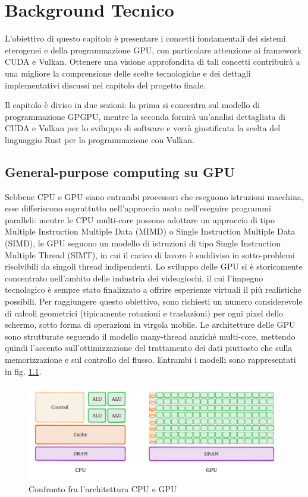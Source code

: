 \chapter{Background Tecnico}
\label{sec:background}


L'obiettivo di questo capitolo è presentare i concetti fondamentali dei sistemi eterogenei e della programmazione GPU, con particolare attenzione ai framework CUDA e Vulkan. Ottenere una visione approfondita di tali concetti contribuirà a una migliore la comprensione delle scelte tecnologiche e dei dettagli implementativi discussi nel capitolo del progetto finale. 

Il capitolo è diviso in due sezioni: la prima si concentra sul modello di programmazione GPGPU, mentre la seconda fornirà un'analisi dettagliata di CUDA e Vulkan per lo sviluppo di software e verrà giustificata la scelta del linguaggio Rust per la programmazione con Vulkan.

\section[General-purpose computing su GPU]{General-purpose computing su GPU}

Sebbene CPU e GPU siano entrambi processori che eseguono istruzioni macchina, esse differiscono soprattutto nell'approccio usato nell'eseguire programmi paralleli: mentre le CPU multi-core possono adottare un approccio di tipo Multiple Instruction Multiple Data (\gls{MIMD}) o Single Instruction Multiple Data (\gls{SIMD}), le GPU seguono un modello di istruzioni di tipo Single Instruction Multiple Thread (\gls{SIMT}), in cui il carico di lavoro è suddiviso in sotto-problemi risolvibili da singoli thread indipendenti. Lo sviluppo delle GPU si è storicamente concentrato nell'ambito delle industria dei videogiochi, il cui l'impegno tecnologico è sempre stato finalizzato a offrire esperienze virtuali il più realistiche possibili. Per raggiungere questo obiettivo, sono richiesti un numero considerevole di calcoli geometrici (tipicamente rotazioni e traslazioni) per ogni pixel dello schermo, sotto forma di operazioni in virgola mobile. Le architetture delle GPU sono strutturate seguendo il modello many-thread anziché multi-core, mettendo quindi l'accento sull'ottimizzazione del trattamento dei dati piuttosto che sulla memorizzazione e sul controllo del flusso.
Entrambi i modelli sono rappresentati in fig. \ref{fig:cpu_vs_gpu}.

\begin{figure}[ht]
    \centering
    \includegraphics[width=.9\linewidth]{images/chapter2/cpu_vs_gpu.png}
    \caption{Confronto fra l'architettura CPU e GPU}
    \label{fig:cpu_vs_gpu}
\end{figure}

